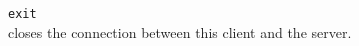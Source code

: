 \documentclass{report}
\begin{document}
\begin{description}
\item {\tt exit}\\
      closes the connection between this client and the server.
\end{description}

\clearpage



\end{document}
